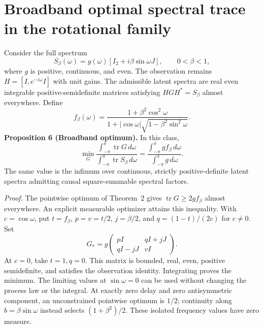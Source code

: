 \section{Broadband optimal spectral trace in the rotational family}\label{app:broadbandR4}
Consider the full spectrum
\begin{equation}\label{eq:broadtarget}
 S_\beta(\omega)=g(\omega)[I_2+i\beta\sin\omega J],
 \qquad 0<\beta<1,
\end{equation}
where $g$ is positive, continuous, and even. The observation remains $H=[I,e^{-i\omega}I]$ with unit gains. The admissible latent spectra are real even integrable positive-semidefinite matrices satisfying $HGH^*=S_\beta$ almost everywhere. Define
\begin{equation}\label{eq:fbeta}
 f_\beta(\omega)=\frac{1+\beta^2\cos^2\omega}
 {1+|\cos\omega|\sqrt{1-\beta^2\sin^2\omega}}.
\end{equation}
\textbf{Proposition 6 (Broadband optimum).} In this class,
\begin{equation}\label{eq:broadopt}
 \min_G\frac{\int_{-\pi}^{\pi}\operatorname{tr}G\,d\omega}
 {\int_{-\pi}^{\pi}\operatorname{tr}S_\beta\,d\omega}
 =\frac{\int_{-\pi}^{\pi}g f_\beta\,d\omega}
 {\int_{-\pi}^{\pi}g\,d\omega}.
\end{equation}
The same value is the infimum over continuous, strictly positive-definite latent spectra admitting causal square-summable spectral factors.

\emph{Proof.} The pointwise optimum of Theorem~2 gives $\operatorname{tr}G\ge 2g f_\beta$ almost everywhere. An explicit measurable optimizer attains this inequality. With $c=\cos\omega$, put $t=f_\beta$, $p=v=t/2$, $j=\beta/2$, and $q=(1-t)/(2c)$ for $c\ne0$. Set
\begin{equation}
 G_*=g\begin{pmatrix}pI&qI+jJ\\qI-jJ&vI\end{pmatrix}.
\end{equation}
At $c=0$, take $t=1,q=0$. This matrix is bounded, real, even, positive semidefinite, and satisfies the observation identity. Integrating proves the minimum. The limiting values at $\sin\omega=0$ can be used without changing the process law or the integral. At exactly zero delay and zero antisymmetric component, an unconstrained pointwise optimum is $1/2$; continuity along $b=\beta\sin\omega$ instead selects $(1+\beta^2)/2$. These isolated frequency values have zero measure.

